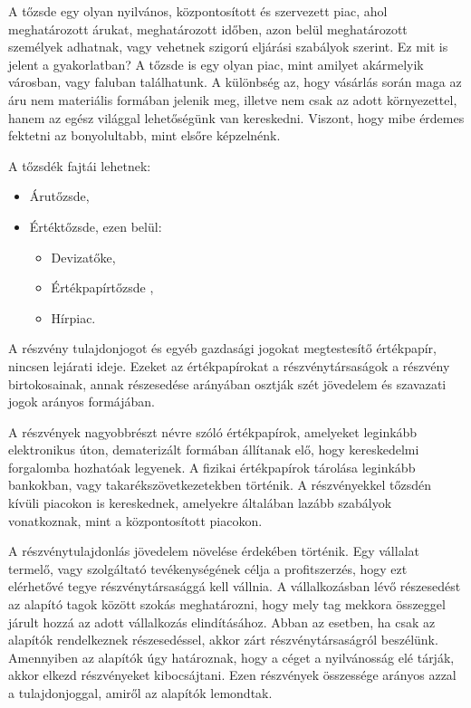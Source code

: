 	A tőzsde egy olyan nyilvános, központosított és szervezett piac, ahol meghatározott árukat, meghatározott időben, azon belül meghatározott személyek adhatnak, vagy vehetnek szigorú eljárási szabályok szerint.  Ez mit is jelent a gyakorlatban? A tőzsde is egy olyan piac, mint amilyet akármelyik városban, vagy faluban találhatunk. A különbség az, hogy vásárlás során maga az áru nem materiális formában jelenik meg, illetve nem csak az adott környezettel, hanem az egész világgal lehetőségünk van kereskedni. Viszont, hogy mibe érdemes fektetni az bonyolultabb, mint elsőre képzelnénk.  \cite{wikiStock}
	
A tőzsdék fajtái lehetnek: 

\begin{itemize}
\item Árutőzsde,
\item Értéktőzsde, ezen belül: 
	\begin{itemize}
	     \item Devizatőke,
	     \item Értékpapírtőzsde ,
	     \item Hírpiac.
	\end{itemize}
\end{itemize}


A részvény tulajdonjogot és egyéb gazdasági jogokat megtestesítő értékpapír, nincsen lejárati ideje. Ezeket az értékpapírokat a részvénytársaságok a részvény birtokosainak, annak részesedése arányában osztják szét jövedelem és szavazati jogok arányos formájában.

	A részvények nagyobbrészt névre szóló értékpapírok, amelyeket leginkább elektronikus úton, dematerizált formában állítanak elő, hogy kereskedelmi forgalomba hozhatóak legyenek. A fizikai értékpapírok tárolása leginkább bankokban, vagy takarékszövetkezetekben történik. A részvényekkel tőzsdén kívüli piacokon is kereskednek, amelyekre általában lazább szabályok vonatkoznak, mint a központosított piacokon. 

	A részvénytulajdonlás jövedelem növelése érdekében történik. Egy vállalat termelő, vagy szolgáltató tevékenységének célja a profitszerzés, hogy ezt elérhetővé tegye részvénytársasággá kell vállnia. A vállalkozásban lévő részesedést az alapító tagok között szokás meghatározni, hogy mely tag mekkora összeggel járult hozzá az adott vállalkozás elindításához. Abban az esetben, ha csak az alapítók rendelkeznek részesedéssel, akkor zárt részvénytársaságról beszélünk. Amennyiben az alapítók úgy határoznak, hogy a céget a nyilvánosság elé tárják, akkor elkezd részvényeket kibocsájtani. Ezen részvények összessége arányos azzal a tulajdonjoggal, amiről az alapítók lemondtak.

